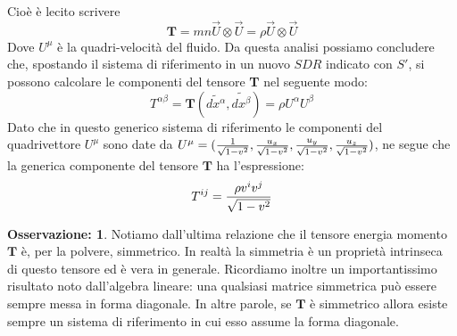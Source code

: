 \documentclass[]{report}
\theoremstyle{definition}
\theoremstyle{Theorem}
\theoremstyle{definition}
\theoremstyle{definition}
\theoremstyle{definition}
\newtheorem{Obs}[Def]{Osservazione:}
\begin{document}
Cioè è lecito scrivere
$$\textbf{T}=mn\vec{U}\otimes\vec{U}=\rho\vec{U}\otimes\vec{U}$$
Dove $U^\mu$ è la quadri-velocità del fluido.
Da questa analisi possiamo concludere che, spostando il sistema di riferimento in un nuovo $SDR$ indicato con $S'$, si possono calcolare le componenti del tensore \textbf{T} nel seguente modo:
$$T^{\alpha\beta}=\textbf{T}(\tilde{dx^\alpha},\tilde{dx^\beta})=\rho U^\alpha U^\beta$$
Dato che in questo generico sistema di riferimento le componenti del quadrivettore $U^\mu$ sono date da $U^\mu=({1\over\sqrt{1-v^2}},{u_x\over\sqrt{1-v^2}},{u_y\over\sqrt{1-v^2}},{u_z\over\sqrt{1-v^2}})$, ne segue che la generica componente del tensore $\textbf{T}$ ha l'espressione:
$$T^{ij}={\rho v^iv^j\over \sqrt{1-v^2}}$$

\begin{Obs}
	Notiamo dall'ultima relazione che il tensore energia momento $\textbf{T}$ è, per la polvere, simmetrico. In realtà la simmetria è un proprietà intrinseca di questo tensore ed è vera in generale. Ricordiamo inoltre un importantissimo risultato noto dall'algebra lineare: una qualsiasi matrice simmetrica può essere sempre messa in forma diagonale. In altre parole, se $\textbf{T}$ è simmetrico allora esiste sempre un sistema di riferimento in cui esso assume la forma diagonale.
\end{Obs}
\end{document}
